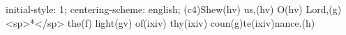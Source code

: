 initial-style: 1;
centering-scheme: english;
(c4)Shew(hv) us,(hv) O(hv) Lord,(g) <sp>*</sp> the(f) light(gv) of(ixiv) thy(ixiv) coun(g)te(ixiv)nance.(h)

